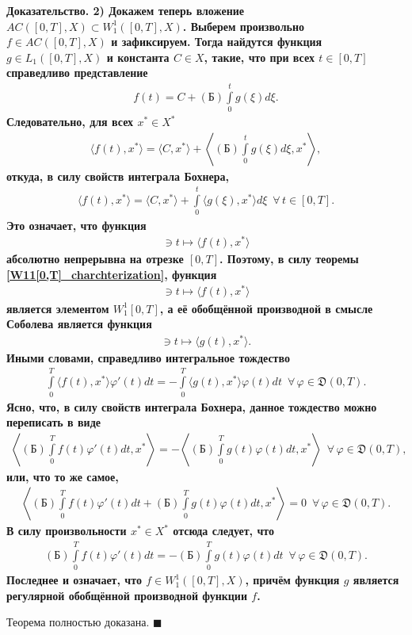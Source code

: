 \documentclass{report}
\newenvironment{Proof}{\par\noindent\bf Доказательство.\rm}{ $\blacksquare$\par}
\begin{document}
\begin{Proof}
2) Докажем теперь вложение $AC([0,T],X)\subset W^1_1([0,T],X)$. Выберем произвольно $f\in AC([0,T],X)$ и зафиксируем. Тогда
найдутся функция $g\in L_1([0,T],X)$ и константа $C\in X$, такие, что при всех $t\in[0,T]$ справедливо представление
\begin{gather*}
f(t)=C+(\textrm{Б})\int\limits_0^tg(\xi)d\xi.
\end{gather*}
Следовательно, для всех $x^*\in X^*$
\begin{gather*}
\langle f(t),x^*\rangle=\langle C,x^*\rangle+\left\langle(\textrm{Б})\int\limits_0^tg(\xi)d\xi,x^*\right\rangle,
\end{gather*}
откуда, в силу свойств интеграла Бохнера,
\begin{gather*}
\langle f(t),x^*\rangle=\langle C,x^*\rangle+\int\limits_0^t\langle g(\xi),x^*\rangle d\xi\,\,\,\forall\,t\in[0,T].
\end{gather*}
Это означает, что функция
\begin{gather*}
[0,T]\ni t\mapsto\langle f(t),x^*\rangle
\end{gather*}
абсолютно непрерывна на отрезке $[0,T]$. Поэтому, в силу теоремы \ref{W11[0,T]_charchterization}, функция
\begin{gather*}
[0,T]\ni t\mapsto\langle f(t),x^*\rangle
\end{gather*}
является элементом $W^1_1[0,T]$, а её обобщённой производной в смысле Соболева является функция
\begin{gather*}
[0,T]\ni t\mapsto\langle g(t),x^*\rangle.
\end{gather*}
Иными словами, справедливо интегральное тождество
\begin{gather*}
\int\limits_0^T\langle f(t),x^*\rangle\varphi'(t)dt=-\int\limits_0^T\langle g(t),x^*\rangle\varphi(t)dt\,\,\,\forall\,\varphi\in
\mathfrak{D}(0,T).
\end{gather*}
Ясно, что, в силу свойств интеграла Бохнера, данное тождество можно переписать в виде
\begin{gather*}
\left\langle (\textrm{Б})\int\limits_0^Tf(t)\varphi'(t)dt,x^*\right\rangle=-
\left\langle (\textrm{Б})\int\limits_0^Tg(t)\varphi(t)dt,x^*\right\rangle\,\,\,\forall\,\varphi\in \mathfrak{D}(0,T),
\end{gather*}
или, что то же самое,
\begin{gather*}
\left\langle (\textrm{Б})\int\limits_0^Tf(t)\varphi'(t)dt+(\textrm{Б})\int\limits_0^Tg(t)\varphi(t)dt,x^*\right\rangle=0\,\,\,\forall\,\varphi\in \mathfrak{D}(0,T).
\end{gather*}
В силу произвольности $x^*\in X^*$ отсюда следует, что
\begin{gather*}
(\textrm{Б})\int\limits_0^Tf(t)\varphi'(t)dt=-(\textrm{Б})\int\limits_0^Tg(t)\varphi(t)dt\,\,\,\forall\,\varphi\in\mathfrak{D}(0,T).
\end{gather*}
Последнее и означает, что $f\in W^1_1([0,T],X)$, причём функция $g$ является регулярной обобщённой производной функции $f$.

Теорема полностью доказана.
\end{Proof}
\end{document}
